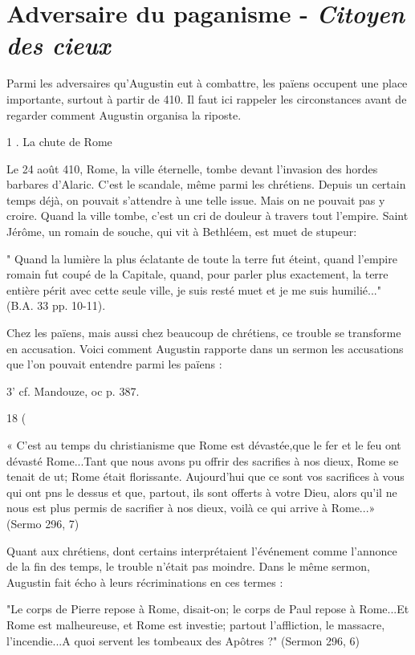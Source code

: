 \section{Adversaire du paganisme - \textit{Citoyen des cieux}}
 


Parmi les adversaires qu'Augustin eut à combattre, les païens occupent une place importante, surtout à partir de 410. Il faut ici rappeler les circonstances avant de regarder comment Augustin organisa la riposte.

1 . La	chute de	Rome

Le 24 août 410, Rome, la ville éternelle, tombe devant l'invasion des hordes barbares d'Alaric. C'est le scandale, même parmi les chrétiens. Depuis un certain temps déjà, on pouvait s'attendre à une telle issue. Mais on ne pouvait pas y croire. Quand la ville tombe, c'est un cri de douleur à travers tout l'empire. Saint Jérôme, un romain de souche, qui vit à Bethléem, est muet de stupeur:

" Quand la lumière la plus éclatante de toute la terre fut éteint, quand l'empire romain fut coupé de la Capitale, quand, pour parler plus exactement, la terre entière périt avec cette seule ville, je suis resté muet et je me suis humilié..." (B.A. 33 pp. 10-11).

Chez les païens, mais aussi chez beaucoup de chrétiens, ce trouble se transforme en accusation. Voici comment Augustin rapporte dans un sermon les accusations que l'on pouvait entendre parmi les païens :



3' cf. Mandouze, oc p. 387.

18
(
 
« C'est au temps du christianisme que Rome est dévastée,que le fer et le feu ont dévasté Rome...Tant que nous avons pu offrir des sacrifies à nos dieux, Rome se tenait de ut; Rome était florissante. Aujourd'hui que ce sont vos sacrifices à vous qui ont pns le dessus et que, partout, ils sont offerts à votre Dieu, alors qu'il ne nous est plus permis de sacrifier à nos dieux, voilà ce qui arrive à Rome...» (Sermo 296, 7)

Quant aux chrétiens, dont certains interprétaient l'événement comme l'annonce de la fin des temps, le trouble n'était pas moindre. Dans le même sermon, Augustin fait écho à leurs récriminations en ces termes :

"Le corps de Pierre repose à Rome, disait-on; le corps de Paul repose à Rome...Et Rome est malheureuse, et Rome est investie; partout l'affliction, le massacre, l'incendie...A quoi servent les tombeaux des Apôtres ?" (Sermon 296, 6)


